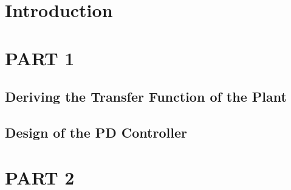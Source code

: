 \documentclass[titlepage, a4paper, 11pt]{article}
\begin{document}


\newpage
\tableofcontents
\newpage

\section{Introduction}


\section{PART 1}
\subsection{Deriving the Transfer Function of the Plant}


\newpage

\subsection{Design of the PD Controller}


\section{PART 2}






\printbibliography
\end{document}

